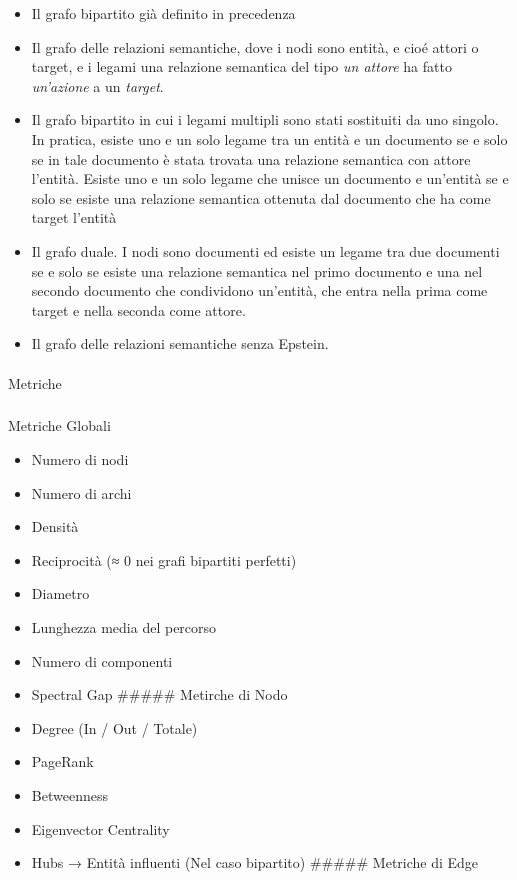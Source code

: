 \documentclass[
  italian,
  a4paper,
]{article}
\makeatletter
\let\oldparagraph\paragraph
\renewcommand{\paragraph}{
    \@ifstar
      \xxxParagraphStar
      \xxxParagraphNoStar
  }
\newcommand{\xxxParagraphStar}[1]{\oldparagraph*{#1}\mbox{}}
\newcommand{\xxxParagraphNoStar}[1]{\oldparagraph{#1}\mbox{}}
\let\oldsubparagraph\subparagraph
\renewcommand{\subparagraph}{
    \@ifstar
      \xxxSubParagraphStar
      \xxxSubParagraphNoStar
  }
\newcommand{\xxxSubParagraphStar}[1]{\oldsubparagraph*{#1}\mbox{}}
\newcommand{\xxxSubParagraphNoStar}[1]{\oldsubparagraph{#1}\mbox{}}
\providecommand{\tightlist}{%
  \setlength{\itemsep}{0pt}\setlength{\parskip}{0pt}}
\makeatother
\begin{document}
\begin{itemize}
\tightlist
\item
  Il grafo bipartito già definito in precedenza
\item
  Il grafo delle relazioni semantiche, dove i nodi sono entità, e cioé
  attori o target, e i legami una relazione semantica del tipo \emph{un
  attore} ha fatto \emph{un'azione} a un \emph{target}.
\item
  Il grafo bipartito in cui i legami multipli sono stati sostituiti da
  uno singolo. In pratica, esiste uno e un solo legame tra un entità e
  un documento se e solo se in tale documento è stata trovata una
  relazione semantica con attore l'entità. Esiste uno e un solo legame
  che unisce un documento e un'entità se e solo se esiste una relazione
  semantica ottenuta dal documento che ha come target l'entità
\item
  Il grafo duale. I nodi sono documenti ed esiste un legame tra due
  documenti se e solo se esiste una relazione semantica nel primo
  documento e una nel secondo documento che condividono un'entità, che
  entra nella prima come target e nella seconda come attore.
\item
  Il grafo delle relazioni semantiche senza Epstein.
\end{itemize}

\paragraph{Metriche}\label{metriche}

\subparagraph{Metriche Globali}\label{metriche-globali}

\begin{itemize}
\tightlist
\item
  Numero di nodi
\item
  Numero di archi
\item
  Densità
\item
  Reciprocità (≈ 0 nei grafi bipartiti perfetti)
\item
  Diametro
\item
  Lunghezza media del percorso
\item
  Numero di componenti
\item
  Spectral Gap \#\#\#\#\# Metirche di Nodo
\item
  Degree (In / Out / Totale)
\item
  PageRank
\item
  Betweenness
\item
  Eigenvector Centrality
\item
  Hubs → Entità influenti (Nel caso bipartito) \#\#\#\#\# Metriche di
  Edge
\end{itemize}
\end{document}
